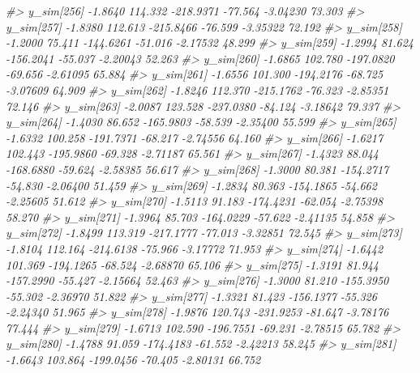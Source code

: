 \documentclass[
  10pt,
  italian,
  a4paper,
  extrafontsizes,onecolumn,openright
  ]{memoir}
\newenvironment{Shaded}{\begin{snugshade}}{\end{snugshade}}
\newcommand{\CommentTok}[1]{\textcolor[rgb]{0.56,0.35,0.01}{\textit{#1}}}
\begin{document}
\begin{Shaded}
\begin{Highlighting}[]
\CommentTok{\#\textgreater{}   y\_sim[256] {-}1.8640 114.332 {-}218.9371 {-}77.564 {-}3.04230 73.303}
\CommentTok{\#\textgreater{}   y\_sim[257] {-}1.8380 112.613 {-}215.8466 {-}76.599 {-}3.35322 72.192}
\CommentTok{\#\textgreater{}   y\_sim[258] {-}1.2000  75.411 {-}144.6261 {-}51.016 {-}2.17532 48.299}
\CommentTok{\#\textgreater{}   y\_sim[259] {-}1.2994  81.624 {-}156.2041 {-}55.037 {-}2.20043 52.263}
\CommentTok{\#\textgreater{}   y\_sim[260] {-}1.6865 102.780 {-}197.0820 {-}69.656 {-}2.61095 65.884}
\CommentTok{\#\textgreater{}   y\_sim[261] {-}1.6556 101.300 {-}194.2176 {-}68.725 {-}3.07609 64.909}
\CommentTok{\#\textgreater{}   y\_sim[262] {-}1.8246 112.370 {-}215.1762 {-}76.323 {-}2.85351 72.146}
\CommentTok{\#\textgreater{}   y\_sim[263] {-}2.0087 123.528 {-}237.0380 {-}84.124 {-}3.18642 79.337}
\CommentTok{\#\textgreater{}   y\_sim[264] {-}1.4030  86.652 {-}165.9803 {-}58.539 {-}2.35400 55.599}
\CommentTok{\#\textgreater{}   y\_sim[265] {-}1.6332 100.258 {-}191.7371 {-}68.217 {-}2.74556 64.160}
\CommentTok{\#\textgreater{}   y\_sim[266] {-}1.6217 102.443 {-}195.9860 {-}69.328 {-}2.71187 65.561}
\CommentTok{\#\textgreater{}   y\_sim[267] {-}1.4323  88.044 {-}168.6880 {-}59.624 {-}2.58385 56.617}
\CommentTok{\#\textgreater{}   y\_sim[268] {-}1.3000  80.381 {-}154.2717 {-}54.830 {-}2.06400 51.459}
\CommentTok{\#\textgreater{}   y\_sim[269] {-}1.2834  80.363 {-}154.1865 {-}54.662 {-}2.25605 51.612}
\CommentTok{\#\textgreater{}   y\_sim[270] {-}1.5113  91.183 {-}174.4231 {-}62.054 {-}2.75398 58.270}
\CommentTok{\#\textgreater{}   y\_sim[271] {-}1.3964  85.703 {-}164.0229 {-}57.622 {-}2.41135 54.858}
\CommentTok{\#\textgreater{}   y\_sim[272] {-}1.8499 113.319 {-}217.1777 {-}77.013 {-}3.32851 72.545}
\CommentTok{\#\textgreater{}   y\_sim[273] {-}1.8104 112.164 {-}214.6138 {-}75.966 {-}3.17772 71.953}
\CommentTok{\#\textgreater{}   y\_sim[274] {-}1.6442 101.369 {-}194.1265 {-}68.524 {-}2.68870 65.106}
\CommentTok{\#\textgreater{}   y\_sim[275] {-}1.3191  81.944 {-}157.2990 {-}55.427 {-}2.15664 52.463}
\CommentTok{\#\textgreater{}   y\_sim[276] {-}1.3000  81.210 {-}155.3950 {-}55.302 {-}2.36970 51.822}
\CommentTok{\#\textgreater{}   y\_sim[277] {-}1.3321  81.423 {-}156.1377 {-}55.326 {-}2.24340 51.965}
\CommentTok{\#\textgreater{}   y\_sim[278] {-}1.9876 120.743 {-}231.9253 {-}81.647 {-}3.78176 77.444}
\CommentTok{\#\textgreater{}   y\_sim[279] {-}1.6713 102.590 {-}196.7551 {-}69.231 {-}2.78515 65.782}
\CommentTok{\#\textgreater{}   y\_sim[280] {-}1.4788  91.059 {-}174.4183 {-}61.552 {-}2.42213 58.245}
\CommentTok{\#\textgreater{}   y\_sim[281] {-}1.6643 103.864 {-}199.0456 {-}70.405 {-}2.80131 66.752}

\end{Highlighting}
\end{Shaded}
\end{document}
